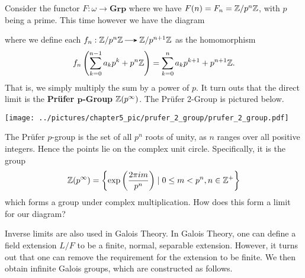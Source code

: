     \begin{example}
        Consider the functor $F: \omega \to \textbf{Grp}$ where we have 
        $F(n) = F_n = \mathbb{Z}/p^n\mathbb{Z}$, with $p$ being a prime. This time however 
        we have the diagram 
        \begin{center}
        \end{center}
        where we define each $f_n: \zz/p^n\zz \to \zz/p^{n+1}\zz$ 
        as the homomorphism 
        \[
            f_n\left( \sum_{k =0}^{n-1}a_kp^k + p^{n}\mathbb{Z} \right)
            = 
            \sum_{k =0}^{n}a_kp^{k+1} + p^{n+1}\mathbb{Z}.
        \]
        That is, we simply multiply the sum by a power of $p$. It turn outs 
        that the direct limit is the \textbf{Prüfer $\bm{p}$-Group} $\mathbb{Z}(p^\infty)$.
        The Prüfer 2-Group is pictured below.
        \begin{center}
            \texttt{[image: ../pictures/chapter5\_pic/prufer\_2\_group/prufer\_2\_group.pdf]}
        \end{center}
        
        The Prüfer $p$-group is the set of all $p^n$ roots of unity,
        as $n$ ranges over all positive integers. Hence the points lie
        on the complex unit circle. Specifically, it is the group  
        \[
            \mathbb{Z}(p^{\infty})
            =
            \left\{\text{exp}\left({\dfrac{2\pi i m}{p^n}}\right) \mid 0 \le m < p^n, n \in \mathbb{Z}^{+}  \right\}  
        \]
        which forms a group under complex multiplication. 
        How does this form a limit for our diagram? 
 
        
        

    \end{example}       

    Inverse limits are also used in Galois Theory. In Galois Theory,
    one can define a field extension $L/F$ to be a finite, normal, separable extension. 
    However, it turns out that one can remove the requirement for  
    the extension to be finite. We then obtain infinite Galois groups,
    which are constructed as follows. 

